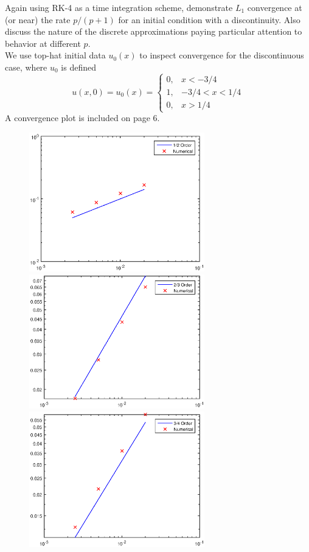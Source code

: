 \item Again using RK-4 as a time integration scheme, demonstrate $L_1$ convergence at (or near) the rate $p/(p+1)$ for an initial condition with a discontinuity. Also discuss the nature of the discrete approximations paying particular attention to behavior at different $p.$\\

We use top-hat initial data $u_0(x)$ to inspect convergence for the discontinuous case, where $u_0$ is defined
$$u(x,0)=u_0(x)=\left\{\begin{array}{cc}0,&x<-3/4\\ 1,&-3/4<x<1/4\\0,&x>1/4\end{array}\right.$$
A convergence plot is included on page 6.
\begin{figure}[h]
\centering
\includegraphics[width=3in]{50conv}
\includegraphics[width=3in]{67conv}\\
\includegraphics[width=3in]{75conv}

\end{figure}
